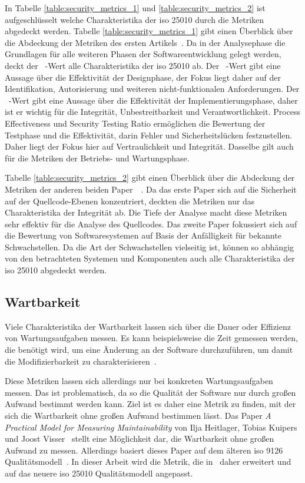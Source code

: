 \documentclass[12pt, a4paper, ngerman]{article}
\begin{document}
In Tabelle \ref{table:security_metrics_1} und \ref{table:security_metrics_2} ist aufgeschlüsselt welche Charakteristika der \ac{iso} 25010 durch die Metriken abgedeckt werden.
Tabelle \ref{table:security_metrics_1} gibt einen Überblick über die Abdeckung der Metriken des ersten Artikels~\cite{Jain2014SecurityMA}.
Da in der Analysephase die Grundlagen für alle weiteren Phasen der Softwareentwicklung gelegt werden, 
deckt der \alpha~-Wert alle Charakteristika der \ac{iso} 25010 ab.
Der \beta~-Wert gibt eine Aussage über die Effektivität der Designphase, 
der Fokus liegt daher auf der Identifikation, Autorisierung und weiteren nicht-funktionalen Anforderungen.
Der \gamma~-Wert gibt eine Aussage über die Effektivität der Implementierungsphase, daher ist er wichtig für die Integrität, Unbestreitbarkeit und Verantwortlichkeit.
Process Effectiveness und Security Testing Ratio ermöglichen die Bewertung der Testphase und 
die Effektivität, darin Fehler und Sicherheitslücken festzustellen. 
Daher liegt der Fokus hier auf Vertraulichkeit und Integrität.
Dasselbe gilt auch für die Metriken der Betriebs- und Wartungsphase.

Tabelle \ref{table:security_metrics_2} gibt einen Überblick über die Abdeckung der Metriken der anderen beiden Paper~\cite{Chowdhury_Chan_Zulkernine_2008}~\cite{Wang_Wang_Guo_Xia_2009}.
Da das erste Paper sich auf die Sicherheit auf der Quellcode-Ebenen konzentriert, deckten die Metriken nur das Charakteristika der Integrität ab.
Die Tiefe der Analyse macht diese Metriken sehr effektiv für die Analyse des Quellcodes.
Das zweite Paper fokussiert sich auf die Bewertung von Softwaresystemen auf Basis der Anfälligkeit für bekannte Schwachstellen.
Da die Art der Schwachstellen vielseitig ist, können so abhängig von den betrachteten Systemen und Komponenten auch alle Charakteristika der \ac{iso} 25010 abgedeckt werden.

\subsection{Wartbarkeit}

Viele Charakteristika der Wartbarkeit lassen sich über die Dauer oder Effizienz von Wartungsaufgaben messen.
Es kann beispielsweise die Zeit gemessen werden, die benötigt wird,
um eine Änderung an der Software durchzuführen,
um damit die Modifizierbarkeit zu charakterisieren~\cite{maintainability_metrics}.%

Diese Metriken lassen sich allerdings nur bei konkreten Wartungsaufgaben messen.
Das ist problematisch, da so die Qualität der Software nur durch großen Aufwand bestimmt werden kann.
Ziel ist es daher eine Metrik zu finden, mit der sich die Wartbarkeit ohne großen Aufwand bestimmen lässt.
Das Paper \emph{A Practical Model for Measuring Maintainability} von Ilja Heitlager, Tobias Kuipers und Joost Visser~\cite{maintainability_metrics}
stellt eine Möglichkeit dar, die Wartbarkeit ohne großen Aufwand zu messen.
Allerdings basiert dieses Paper auf dem älteren \ac{iso} 9126 Qualitätsmodell~\cite{maintainability_metrics,ISO9126}.
In dieser Arbeit wird die Metrik, die in~\cite{maintainability_metrics} daher erweitert
und auf das neuere \ac{iso} 25010 Qualitätsmodell angepasst.
\end{document}
